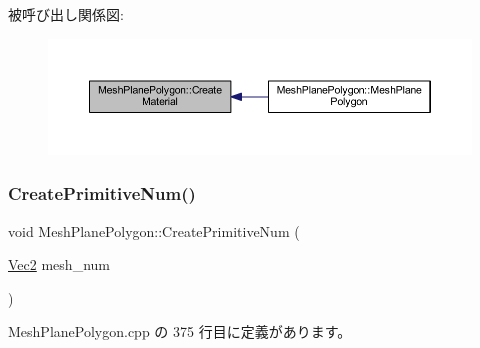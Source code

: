 被呼び出し関係図\+:\nopagebreak
\begin{figure}[H]
\begin{center}
\leavevmode
\includegraphics[width=350pt]{class_mesh_plane_polygon_aea5b128def1dae8f391b80be25172b36_icgraph}
\end{center}
\end{figure}
\mbox{\label{class_mesh_plane_polygon_a0228c78794fe950ccb69b3a77a0239b8}} 
\subsubsection{\texorpdfstring{Create\+Primitive\+Num()}{CreatePrimitiveNum()}}
{\footnotesize\ttfamily void Mesh\+Plane\+Polygon\+::\+Create\+Primitive\+Num (\begin{DoxyParamCaption}\item[{\mbox{\hyperlink{_vector3_d_8h_a5ef6e95dfc5f9d3820b71772d99bbc25}{Vec2}}}]{mesh\+\_\+num }\end{DoxyParamCaption})\hspace{0.3cm}{\ttfamily [private]}}



 Mesh\+Plane\+Polygon.\+cpp の 375 行目に定義があります。

